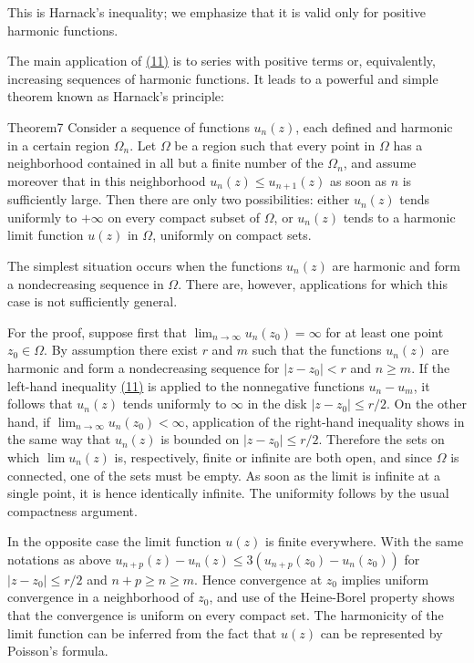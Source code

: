 This is Harnack's inequality; we emphasize that it is valid only for positive harmonic functions.

The main application of \hyperref[eq:6.11]{(11)} is to series with positive terms or, equivalently, increasing sequences of harmonic functions. It leads to a powerful and simple theorem known as Harnack's principle:

\begin{originalstatement}{Theorem}{7}\label{thm:6.7}
Consider a sequence of functions $u_{n}(z)$, each defined and harmonic in a certain region $\Omega_{n}$. Let $\Omega$ be a region such that every point in $\Omega$ has a neighborhood contained in all but a finite number of the $\Omega_{n}$, and assume moreover that in this neighborhood $u_{n}(z) \leq u_{n+1}(z)$ as soon as $n$ is sufficiently large. Then there are only two possibilities: either $u_{n}(z)$ tends uniformly to $+\infty$ on every compact subset of $\Omega$, or $u_{n}(z)$ tends to a harmonic limit function $u(z)$ in $\Omega$, uniformly on compact sets.
\end{originalstatement}
The simplest situation occurs when the functions $u_{n}(z)$ are harmonic and form a nondecreasing sequence in $\Omega$. There are, however, applications for which this case is not sufficiently general.

For the proof, suppose first that $\lim_{n\to \infty}u_n(z_0) = \infty$ for at least one point $z_0\in \Omega$. By assumption there exist $r$ and $m$ such that the functions $u_{n}(z)$ are harmonic and form a nondecreasing sequence for $|z - z_0| < r$ and $n\geq m$. If the left-hand inequality \hyperref[eq:6.11]{(11)} is applied to the nonnegative functions $u_{n} - u_{m}$, it follows that $u_{n}(z)$ tends uniformly to $\infty$ in the disk $|z - z_0|\leq r / 2$. On the other hand, if $\lim_{n\to \infty}u_n(z_0) < \infty$, application of the right-hand inequality shows in the same way that $u_{n}(z)$ is bounded on $|z - z_0|\leq r / 2$. Therefore the sets on which $\lim u_n(z)$ is, respectively, finite or infinite are both open, and since $\Omega$ is connected, one of the sets must be empty. As soon as the limit is infinite at a single point, it is hence identically infinite. The uniformity follows by the usual compactness argument.

In the opposite case the limit function $u(z)$ is finite everywhere. With the same notations as above $u_{n+p}(z) - u_n(z) \leq 3(u_{n+p}(z_0) - u_n(z_0))$ for $|z - z_0| \leq r/2$ and $n + p \geq n \geq m$. Hence convergence at $z_0$ implies uniform convergence in a neighborhood of $z_0$, and use of the Heine-Borel property shows that the convergence is uniform on every compact set. The harmonicity of the limit function can be inferred from the fact that $u(z)$ can be represented by Poisson's formula.

